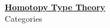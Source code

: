 \documentclass[hott-all.tex]{subfiles}
\begin{document}
\begin{center}
  {\Large{\underline{\textbf{Homotopy Type Theory}}}} \\[2mm]
  {\large Categories}
\end{center}
\setcounter{chapter}{9}

\label{cha:category-theory}

%
%
%
\end{document}
